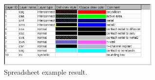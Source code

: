 \begin{figure}[h!] \begin{center}
\includegraphics[width=8cm]{./figures/ex_spreadsheet.eps}
\caption{Spreadsheet example result.}
\end{center} \end{figure}

